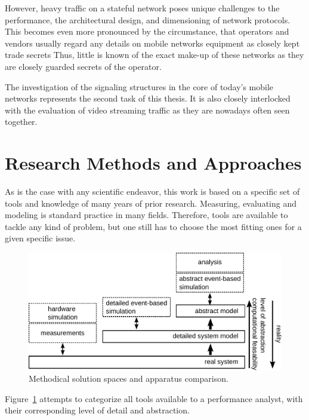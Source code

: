 However, heavy traffic on a stateful network poses unique challenges to the performance, the architectural design, and dimensioning of network protocols. This becomes even more pronounced by the circumstance, that operators and vendors usually regard any details on mobile networks equipment as closely kept trade secrets Thus, little is known of the exact make-up of these networks as they are closely guarded secrets of the operator.

The investigation of the signaling structures in the core of today's mobile networks represents the second task of this thesis. It is also closely interlocked with the evaluation of video streaming traffic as they are nowadays often seen together.


\section{Research Methods and Approaches}

As is the case with any scientific endeavor, this work is based on a specific set of tools and knowledge of many years of prior research. Measuring, evaluating and modeling is standard practice in many fields. Therefore, tools are available to tackle any kind of problem, but one still has to choose the most fitting ones for a given specific issue.

\begin{figure}[htb]
    \centering
    \includegraphics[width=1.0\textwidth]{images/apparatus.pdf}
    \caption{Methodical solution spaces and apparatus comparison.}
\label{c1:fig:appcomp}
\end{figure}

Figure~\ref{c1:fig:appcomp} attempts to categorize all tools available to a performance analyst, with their corresponding level of detail and abstraction.

